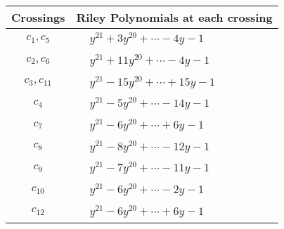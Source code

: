 \documentclass[1p]{elsarticle_modified}
\theoremstyle{definition}
\begin{document}
\begin{tabular}{m{50pt}|m{274pt}}
Crossings & \hspace{64pt}Riley Polynomials at each crossing \\
\hline $$\begin{aligned}c_{1},c_{5}\end{aligned}$$&$\begin{aligned}
&y^{21}+3 y^{20}+\cdots-4 y-1
\end{aligned}$\\
\hline $$\begin{aligned}c_{2},c_{6}\end{aligned}$$&$\begin{aligned}
&y^{21}+11 y^{20}+\cdots-4 y-1
\end{aligned}$\\
\hline $$\begin{aligned}c_{3},c_{11}\end{aligned}$$&$\begin{aligned}
&y^{21}-15 y^{20}+\cdots+15 y-1
\end{aligned}$\\
\hline $$\begin{aligned}c_{4}\end{aligned}$$&$\begin{aligned}
&y^{21}-5 y^{20}+\cdots-14 y-1
\end{aligned}$\\
\hline $$\begin{aligned}c_{7}\end{aligned}$$&$\begin{aligned}
&y^{21}-6 y^{20}+\cdots+6 y-1
\end{aligned}$\\
\hline $$\begin{aligned}c_{8}\end{aligned}$$&$\begin{aligned}
&y^{21}-8 y^{20}+\cdots-12 y-1
\end{aligned}$\\
\hline $$\begin{aligned}c_{9}\end{aligned}$$&$\begin{aligned}
&y^{21}-7 y^{20}+\cdots-11 y-1
\end{aligned}$\\
\hline $$\begin{aligned}c_{10}\end{aligned}$$&$\begin{aligned}
&y^{21}-6 y^{20}+\cdots-2 y-1
\end{aligned}$\\
\hline $$\begin{aligned}c_{12}\end{aligned}$$&$\begin{aligned}
&y^{21}-6 y^{20}+\cdots+6 y-1
\end{aligned}$\\
\hline
\end{tabular}\\~\\
\end{document}
